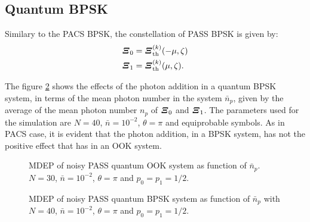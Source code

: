     \subsection{Quantum BPSK}
        Similary to the PACS BPSK, the constellation of PASS BPSK is given by:
        \begin{subequations}
            \begin{align}
                \Operator{\varXi}_0 &= \Operator{\varXi}_{\mathrm{th}}^{(k)}(-\mu,\zeta)\\
                \Operator{\varXi}_1 &= \Operator{\varXi}_{\mathrm{th}}^{(k)}(\mu,\zeta).
            \end{align}
        \end{subequations}
        
        The figure \ref{fig:3.7} shows the effects of the photon addition in a quantum BPSK
        system, in terms of the mean photon number in the system $\bar{n}_p$, given by the average of 
        the mean photon number $n_p$ of $\Operator{\varXi}_0$ and $\Operator{\varXi}_1$. The parameters used
        for the simulation are $N=40$, $\bar{n}=10^{-2}$, $\theta=\pi$ and equiprobable symbols.
        As in PACS case, it is evident that the photon addition, in a BPSK system, has not
        the positive effect that has in an OOK system.
        
        \begin{figure}[t]
            \begin{center}
                
                \caption{MDEP of noisy PASS quantum OOK system as function of $\bar{n}_p$.\\
                $N=30$, $\bar{n}=10^{-2}$, $\theta=\pi$ and $p_0=p_1=1/2$.}
                \label{fig:3.6}
            \end{center}
        \end{figure}
        \begin{figure}[t]
            \begin{center}
                
                \caption{MDEP of noisy PASS quantum BPSK system as function of $\bar{n}_p$ with
                $N=40$, $\bar{n}=10^{-2}$, $\theta=\pi$ and $p_0=p_1=1/2$.}
                \label{fig:3.7}
            \end{center}
        \end{figure}